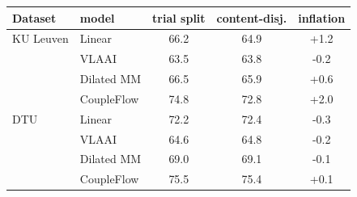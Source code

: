 \begin{tabular}{llccc}\toprule
Dataset & model & trial split & content-disj. & inflation \\\midrule
KU Leuven & Linear & 66.2 & 64.9 & +1.2 \\
 & VLAAI & 63.5 & 63.8 & -0.2 \\
 & Dilated MM & 66.5 & 65.9 & +0.6 \\
 & CoupleFlow & 74.8 & 72.8 & +2.0 \\
\midrule
DTU & Linear & 72.2 & 72.4 & -0.3 \\
 & VLAAI & 64.6 & 64.8 & -0.2 \\
 & Dilated MM & 69.0 & 69.1 & -0.1 \\
 & CoupleFlow & 75.5 & 75.4 & +0.1 \\
\bottomrule\end{tabular}
